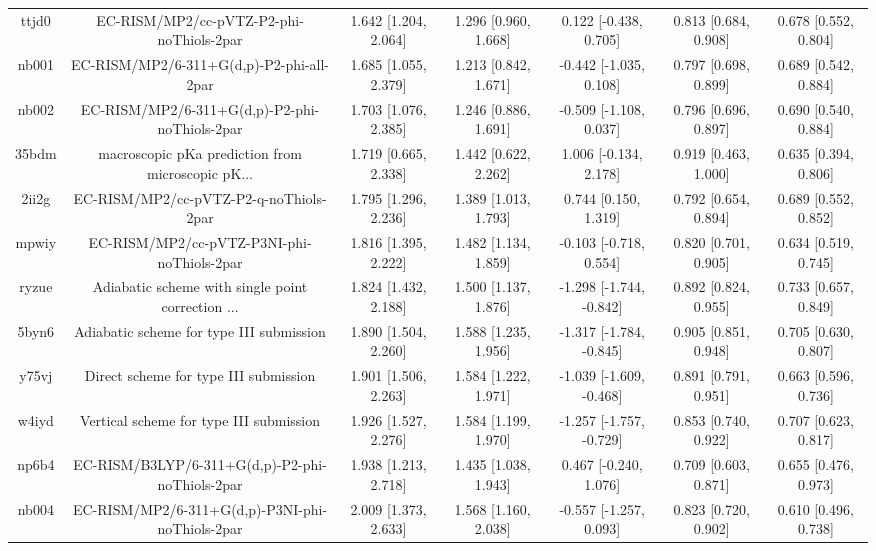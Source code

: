 \documentclass{article}
\begin{document}
\begin{center}
\begin{longtable}{|ccccccc|}
 ttjd0 &           EC-RISM/MP2/cc-pVTZ-P2-phi-noThiols-2par &  1.642 [1.204, 2.064] &  1.296 [0.960, 1.668] &    0.122 [-0.438, 0.705] &  0.813 [0.684, 0.908] &   0.678 [0.552, 0.804] \\
 nb001 &           EC-RISM/MP2/6-311+G(d,p)-P2-phi-all-2par &  1.685 [1.055, 2.379] &  1.213 [0.842, 1.671] &   -0.442 [-1.035, 0.108] &  0.797 [0.698, 0.899] &   0.689 [0.542, 0.884] \\
 nb002 &      EC-RISM/MP2/6-311+G(d,p)-P2-phi-noThiols-2par &  1.703 [1.076, 2.385] &  1.246 [0.886, 1.691] &   -0.509 [-1.108, 0.037] &  0.796 [0.696, 0.897] &   0.690 [0.540, 0.884] \\
 35bdm &  macroscopic pKa prediction from microscopic pK... &  1.719 [0.665, 2.338] &  1.442 [0.622, 2.262] &    1.006 [-0.134, 2.178] &  0.919 [0.463, 1.000] &   0.635 [0.394, 0.806] \\
 2ii2g &             EC-RISM/MP2/cc-pVTZ-P2-q-noThiols-2par &  1.795 [1.296, 2.236] &  1.389 [1.013, 1.793] &     0.744 [0.150, 1.319] &  0.792 [0.654, 0.894] &   0.689 [0.552, 0.852] \\
 mpwiy &         EC-RISM/MP2/cc-pVTZ-P3NI-phi-noThiols-2par &  1.816 [1.395, 2.222] &  1.482 [1.134, 1.859] &   -0.103 [-0.718, 0.554] &  0.820 [0.701, 0.905] &   0.634 [0.519, 0.745] \\
 ryzue &  Adiabatic scheme with single point correction ... &  1.824 [1.432, 2.188] &  1.500 [1.137, 1.876] &  -1.298 [-1.744, -0.842] &  0.892 [0.824, 0.955] &   0.733 [0.657, 0.849] \\
 5byn6 &           Adiabatic scheme for type III submission &  1.890 [1.504, 2.260] &  1.588 [1.235, 1.956] &  -1.317 [-1.784, -0.845] &  0.905 [0.851, 0.948] &   0.705 [0.630, 0.807] \\
 y75vj &              Direct scheme for type III submission &  1.901 [1.506, 2.263] &  1.584 [1.222, 1.971] &  -1.039 [-1.609, -0.468] &  0.891 [0.791, 0.951] &   0.663 [0.596, 0.736] \\
 w4iyd &            Vertical scheme for type III submission &  1.926 [1.527, 2.276] &  1.584 [1.199, 1.970] &  -1.257 [-1.757, -0.729] &  0.853 [0.740, 0.922] &   0.707 [0.623, 0.817] \\
 np6b4 &    EC-RISM/B3LYP/6-311+G(d,p)-P2-phi-noThiols-2par &  1.938 [1.213, 2.718] &  1.435 [1.038, 1.943] &    0.467 [-0.240, 1.076] &  0.709 [0.603, 0.871] &   0.655 [0.476, 0.973] \\
 nb004 &    EC-RISM/MP2/6-311+G(d,p)-P3NI-phi-noThiols-2par &  2.009 [1.373, 2.633] &  1.568 [1.160, 2.038] &   -0.557 [-1.257, 0.093] &  0.823 [0.720, 0.902] &   0.610 [0.496, 0.738] \\

\end{longtable}
\end{center}
\end{document}
